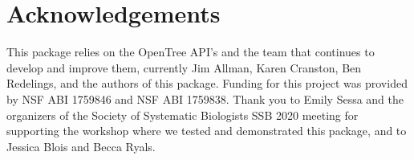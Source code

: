 \documentclass[oupdraft]{sysbio_sse}
\begin{document}
\section{Acknowledgements}
This package relies on the OpenTree API's and the team that continues to develop and improve them, currently Jim Allman, Karen Cranston, Ben Redelings, and the authors of this package. Funding for this project was provided by NSF ABI 1759846 and NSF ABI 1759838.
Thank you to Emily Sessa and the organizers of the Society of Systematic Biologists SSB 2020 meeting for supporting the workshop where we tested and demonstrated this package, and to Jessica Blois and Becca Ryals.


\bigskip\bigskip

\end{document}
